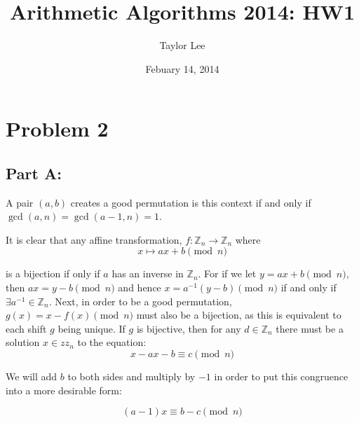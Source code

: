 \documentclass[12pt]{article}
\theoremstyle{moo}
\def\zz{{\mathbb Z}}
\begin{document}
\fontseries {\seriesdefault}
\fontshape {\shapedefault}
\selectfont

\title{ Arithmetic Algorithms 2014: HW1}
\date{Febuary 14, 2014}         %
\author{Taylor Lee}      %
\maketitle                      %




\section*{Problem 2}


\subsection*{Part A:}
A pair $\left(a,b\right)$ creates a good permutation is this context if and only if $\gcd(a,n) = \gcd(a-1,n) = 1$.

It is clear that any affine transformation, $f: \zz_{n} \to \zz_{n}$ where
\[
x \mapsto ax + b \pmod{n}
\]

is a bijection if only if $a$ has an inverse in $\zz_n$. For if we let $y = ax + b \pmod{n}$, then $ax = y - b \pmod{n}$ and hence $x = a^{-1}\left( y - b \right) \pmod{n}$ if and only if $\exists a^{-1} \in \zz_{n}$. Next, in order to be a good permutation, $g(x) = x - f(x) \pmod{n}$ must also be a bijection, as this is equivalent to each shift $g$ being unique. If $g$ is bijective, then for any $d \in \zz_n$ there must be a solution $x \in zz_n$ to the equation: 
\[
x - ax - b \equiv c \pmod{n}
\]

We will add $b$ to both sides and multiply by $-1$ in order to put this congruence into a more desirable form:

\[
\left(a -1 \right)x \equiv b - c \pmod{n}
\]
\end{document}
